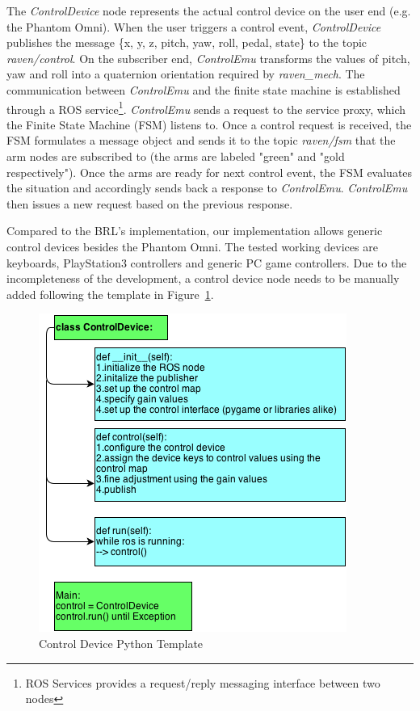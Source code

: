 \documentclass[letterpaper,twocolumn,10pt]{article}
\begin{document}
The \emph{ControlDevice} node represents the actual control device on
the user end (e.g. the Phantom Omni). When the user triggers a control
event, \emph{ControlDevice} publishes the message \{x, y, z, pitch,
yaw, roll, pedal, state\} to the topic \emph{raven/control}. On the
subscriber end, \emph{ControlEmu} transforms the values of pitch, yaw
and roll into a quaternion orientation required by
\emph{raven\_mech}. The communication between \emph{ControlEmu} and
the finite state machine is established through a ROS
service\footnote{ROS Services provides a request/reply messaging
  interface between two nodes}. \emph{ControlEmu} sends a request to
the service proxy, which the Finite State Machine (FSM)
listens to. Once a control request is received, the FSM formulates a
message object and sends it to the topic \emph{raven/fsm} that the arm
nodes are subscribed to (the arms are labeled "green" and "gold
respectively"). Once the arms are ready for next control event, the
FSM evaluates the situation and accordingly sends back a response to
\emph{ControlEmu}. \emph{ControlEmu} then issues a new request based
on the previous response.

Compared to the BRL's implementation, our implementation allows
generic control devices besides the Phantom Omni. The tested working
devices are keyboards, PlayStation3 controllers and generic PC game
controllers. Due to the incompleteness of the development, a control
device node needs to be manually added following the template in
Figure~\ref{fig:control_device_template}.

\begin{figure}[h!]
  \includegraphics[width=1.0\columnwidth]{ControlDeviceTemplate.png}
  \caption{Control Device Python Template}
  \label{fig:control_device_template}
\end{figure}
\end{document}
